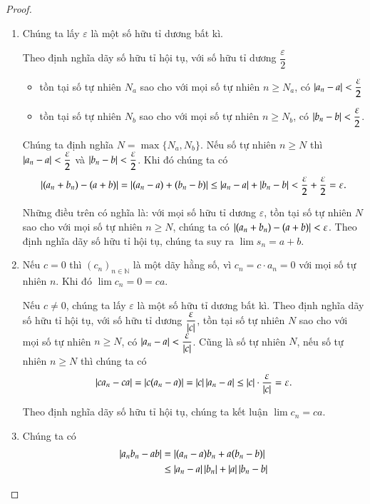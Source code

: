 \begin{proof}
    \begin{enumerate}[label={(\roman*)}]
        \item Chúng ta lấy $\varepsilon$ là một số hữu tỉ dương bất kì.

              Theo định nghĩa dãy số hữu tỉ hội tụ, với số hữu tỉ dương $\dfrac{\varepsilon}{2}$
              \begin{itemize}
                  \item tồn tại số tự nhiên $N_{a}$ sao cho với mọi số tự nhiên $n\geq N_{a}$, có $\left\vert{a_{n} - a}\right\vert < \dfrac{\varepsilon}{2}$
                  \item tồn tại số tự nhiên $N_{b}$ sao cho với mọi số tự nhiên $n\geq N_{b}$, có $\left\vert{b_{n} - b}\right\vert < \dfrac{\varepsilon}{2}$.
              \end{itemize}

              Chúng ta định nghĩa $N = \max\{ N_{a}, N_{b} \}$. Nếu số tự nhiên $n\geq N$ thì $\left\vert{a_{n} - a}\right\vert < \dfrac{\varepsilon}{2}$ và $\left\vert{b_{n} - b}\right\vert < \dfrac{\varepsilon}{2}$. Khi đó chúng ta có
              \[
                  \left\vert{(a_{n} + b_{n}) - (a + b)}\right\vert  = \left\vert{(a_{n} - a) + (b_{n} - b)}\right\vert \leq \left\vert{a_{n} - a}\right\vert + \left\vert{b_{n} - b}\right\vert < \frac{\varepsilon}{2} + \frac{\varepsilon}{2} = \varepsilon.
              \]

              Những điều trên có nghĩa là: với mọi số hữu tỉ dương $\varepsilon$, tồn tại số tự nhiên $N$ sao cho với mọi số tự nhiên $n\geq N$, chúng ta có $\left\vert{(a_{n} + b_{n}) - (a + b)}\right\vert < \varepsilon$. Theo định nghĩa dãy số hữu tỉ hội tụ, chúng ta suy ra $\lim s_{n} = a + b$.
        \item Nếu $c = 0$ thì ${(c_{n})}_{n\in\mathbb{N}}$ là một dãy hằng số, vì $c_{n} = c\cdot a_{n} = 0$ với mọi số tự nhiên $n$. Khi đó $\lim c_{n} = 0 = ca$.

              Nếu $c\ne 0$, chúng ta lấy $\varepsilon$ là một số hữu tỉ dương bất kì. Theo định nghĩa dãy số hữu tỉ hội tụ, với số hữu tỉ dương $\dfrac{\varepsilon}{\left\vert{c}\right\vert}$, tồn tại số tự nhiên $N$ sao cho với mọi số tự nhiên $n\geq N$, có $\left\vert{a_{n} - a}\right\vert < \dfrac{\varepsilon}{\left\vert{c}\right\vert}$. Cũng là số tự nhiên $N$, nếu số tự nhiên $n\geq N$ thì chúng ta có
              \[
                  \left\vert{ca_{n} - ca}\right\vert = \left\vert{c(a_{n} - a)}\right\vert = \left\vert{c}\right\vert\left\vert{a_{n} - a}\right\vert \leq \left\vert{c}\right\vert\cdot\frac{\varepsilon}{\left\vert{c}\right\vert} = \varepsilon.
              \]

              Theo định nghĩa dãy số hữu tỉ hội tụ, chúng ta kết luận $\lim c_{n} = ca$.
        \item Chúng ta có
              \begin{align*}
                  \left\vert{a_{n}b_{n} - ab}\right\vert & = \left\vert{(a_{n} - a)b_{n} + a(b_{n} - b)}\right\vert                  \\
                                        & \leq \left\vert{a_{n} - a}\right\vert\left\vert{b_{n}}\right\vert + \left\vert{a}\right\vert\left\vert{b_{n} - b}\right\vert
              \end{align*}


\end{enumerate}
\end{proof}
